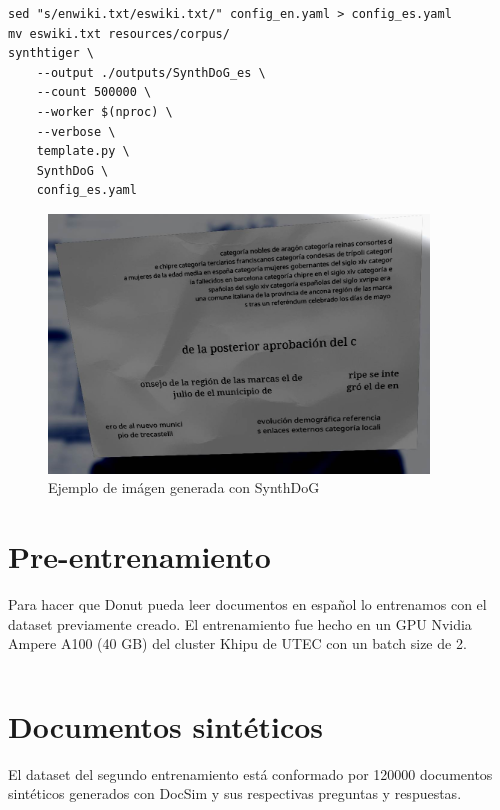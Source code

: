 \documentclass[../main.tex]{subfiles}
\begin{document}
\begin{verbatim}
sed "s/enwiki.txt/eswiki.txt/" config_en.yaml > config_es.yaml
mv eswiki.txt resources/corpus/
synthtiger \
	--output ./outputs/SynthDoG_es \
	--count 500000 \
	--worker $(nproc) \
	--verbose \
	template.py \
	SynthDoG \
	config_es.yaml
\end{verbatim}

\begin{figure}[H]
	\centering
	\includegraphics[width=0.9\textwidth]{image_475821.jpg}
	\caption{Ejemplo de imágen generada con SynthDoG}
\end{figure}

\section{Pre-entrenamiento}

Para hacer que Donut pueda leer documentos en español
lo entrenamos con el dataset previamente creado.
El entrenamiento fue hecho en un GPU Nvidia Ampere A100 (40 GB) del cluster Khipu de UTEC con un batch size de 2.

\inputminted[bgcolor=codeBack, tabsize=2]{bash}{train-es.sh}

\section{Documentos sintéticos}
El dataset del segundo entrenamiento está conformado por 120000 documentos sintéticos generados con DocSim\cite{DocSim} y sus respectivas preguntas y respuestas.
\end{document}
